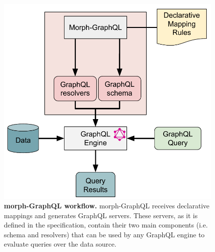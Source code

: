 \begin{figure}[!ht]
    \centering
    \includegraphics[width=0.8\linewidth]{figures/workflow-morphgraphql.pdf}
    \caption[morph-GraphQL workflow]{\textbf{morph-GraphQL workflow.} morph-GraphQL receives declarative mappings and generates GraphQL servers. These servers, as it is defined in the specification, contain their two main components (i.e. schema and resolvers) that can be used by any GraphQL engine to evaluate queries over the data source.}
    \label{fig:obda2graphql}
\end{figure}



